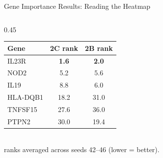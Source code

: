 \documentclass[aspectratio=169]{beamer}
\begin{document}
\begin{frame}{Gene Importance Results: Reading the Heatmap}
\begin{columns}[T]
\begin{column}{0.45\textwidth}
\begin{tabular}{l c c}
                \toprule
                \textbf{Gene} & \textbf{2C rank} & \textbf{2B rank} \\
                \midrule
                IL23R    & \textbf{1.6} & \textbf{2.0} \\
                NOD2     & 5.2  & 5.6 \\
                IL19     & 8.8  & 6.0 \\
                HLA-DQB1 & 18.2 & 31.0 \\
                TNFSF15  & 27.6 & 36.0 \\
                PTPN2    & 30.0 & 19.4 \\
                \bottomrule
            \end{tabular}\\[4pt]
            \footnotesize ranks averaged across seeds 42--46 (lower = better).
        \end{column}
    \end{columns}
\end{frame}
\end{document}
